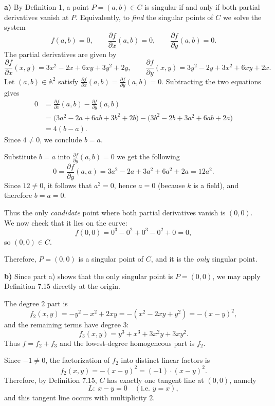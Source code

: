 \documentclass[a4paper,12pt,openany]{article}
\theoremstyle{plain}
\theoremstyle{definition}
\theoremstyle{remark}
\begin{document}
\medskip
\textbf{a)} By Definition 1, a point $P=(a,b)\in C$ is singular if and only if both partial derivatives vanish at $P$.
Equivalently, to \emph{find} the singular points of $C$ we solve the system
\[
f(a,b)=0,\qquad \frac{\partial f}{\partial x}(a,b)=0,\qquad \frac{\partial f}{\partial y}(a,b)=0.
\]
The partial derivatives are given by
\[
\frac{\partial f}{\partial x}(x,y)=3x^{2}-2x+6xy+3y^{2}+2y,
\qquad
\frac{\partial f}{\partial y}(x,y)=3y^{2}-2y+3x^{2}+6xy+2x.
\]
Let $(a,b)\in \mathbb{A}^2$ satisfy $\frac{\partial f}{\partial x}(a,b)=\frac{\partial f}{\partial y}(a,b)=0$.
Subtracting the two equations gives
\begin{align*}
0
&=\frac{\partial f}{\partial x}(a,b)-\frac{\partial f}{\partial y}(a,b)\\
&=\bigl(3a^{2}-2a+6ab+3b^{2}+2b\bigr)-\bigl(3b^{2}-2b+3a^{2}+6ab+2a\bigr)\\
&=4(b-a).
\end{align*}
Since $4\neq 0$, we conclude $b=a$.

Substitute $b=a$ into $\frac{\partial f}{\partial y}(a,b)=0$ we get the following
\[
0=\frac{\partial f}{\partial y}(a,a)=3a^{2}-2a+3a^{2}+6a^{2}+2a=12a^{2}.
\]
Since $12\neq 0$, it follows that $a^{2}=0$, hence $a=0$ (because $k$ is a field), and therefore $b=a=0$.

Thus the only \emph{candidate} point where both partial derivatives vanish is $(0,0)$.
We now check that it lies on the curve:
\[
f(0,0)=0^{3}-0^{2}+0^{3}-0^{2}+0=0,
\]
so $(0,0)\in C$.

Therefore, $P=(0,0)$ is a singular point of $C$, and it is the \emph{only} singular point.

\medskip

\textbf{b)} Since part a) shows that the only singular point is $P=(0,0)$, we may apply Definition 7.15 directly at the origin.

The degree $2$ part is
\[
f_{2}(x,y)= -y^{2}-x^{2}+2xy = -(x^{2}-2xy+y^{2})=-(x-y)^{2},
\]
and the remaining terms have degree $3$:
\[
f_{3}(x,y)=y^{3}+x^{3}+3x^{2}y+3xy^{2}.
\]
Thus $f=f_{2}+f_{3}$ and the lowest-degree homogeneous part is $f_{2}$.

Since $-1\neq 0$, the factorization of $f_{2}$ into distinct linear factors is
\[
f_{2}(x,y)=-(x-y)^{2}=(-1)\cdot (x-y)^{2}.
\]
Therefore, by Definition 7.15, $C$ has exactly one tangent line at $(0,0)$, namely
\[
L:\ x-y=0 \quad (\text{i.e.\ } y=x),
\]
and this tangent line occurs with multiplicity $2$.

\medskip
\end{document}
